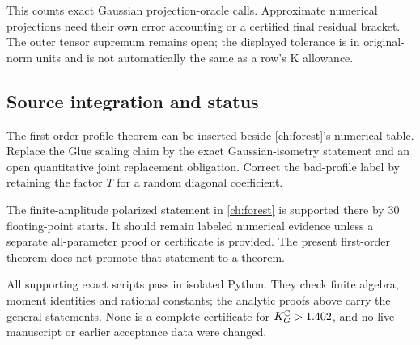 This counts exact Gaussian projection-oracle calls. Approximate
numerical projections need their own error accounting or a certified
final residual bracket. The outer tensor supremum remains open;
the displayed tolerance is in original-norm units and is not
automatically the same as a row's K allowance.

\subsection{Source integration and status}

The first-order profile theorem can be inserted beside \autoref{ch:forest}'s
numerical table. Replace the Glue scaling claim by the exact
Gaussian-isometry statement and an open quantitative joint
replacement obligation. Correct the bad-profile label by retaining
the factor \(T\) for a random diagonal coefficient.

The finite-amplitude polarized statement in \autoref{ch:forest} is supported
there by 30 floating-point starts. It should remain labeled numerical
evidence unless a separate all-parameter proof or certificate is
provided. The present first-order theorem does not promote that
statement to a theorem.

All supporting exact scripts pass in isolated Python. They check
finite algebra, moment identities and rational constants; the
analytic proofs above carry the general statements. None is a
complete certificate for \(K_G^{\mathbb C}>1.402\), and no live manuscript
or earlier acceptance data were changed.
